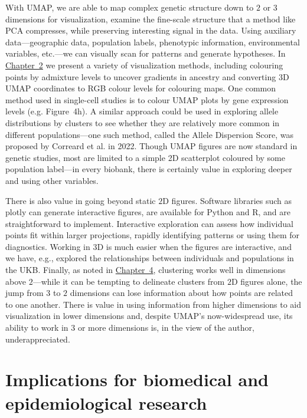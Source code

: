 With UMAP, we are able to map complex genetic structure down to $2$ or $3$ dimensions for visualization, examine the fine-scale structure that a method like PCA compresses, while preserving interesting signal in the data. Using auxiliary data---geographic data, population labels, phenotypic information, environmental variables, etc.---we can visually scan for patterns and generate hypotheses. In \hyperref[chap:chapter2]{Chapter~2} we present a variety of visualization methods, including colouring points by admixture levels to uncover gradients in ancestry and converting 3D UMAP coordinates to RGB colour levels for colouring maps. One common method used in single-cell studies is to colour UMAP plots by gene expression levels (e.g. \citep{jessa_stalled_2019} Figure~4h). A similar approach could be used in exploring allele distributions by clusters to see whether they are relatively more common in different populations---one such method, called the Allele Dispersion Score, was proposed by Correard et al. in 2022\citep{correard_allele_2022}. Though UMAP figures are now standard in genetic studies, most are limited to a simple 2D scatterplot coloured by some population label---in every biobank, there is certainly value in exploring deeper and using other variables.

There is also value in going beyond static $2$D figures. Software libraries such as plotly\citep{plotly} can generate interactive figures, are available for Python and R, and are straightforward to implement. Interactive exploration can assess how individual points fit within larger projections, rapidly identifying patterns or using them for diagnostics. Working in $3$D is much easier when the figures are interactive, and we have, e.g., explored the relationships between individuals and populations in the UKB. Finally, as noted in \hyperref[chap:chapter4]{Chapter~4}, clustering works well in dimensions above $2$---while it can be tempting to delineate clusters from $2$D figures alone, the jump from $3$ to $2$ dimensions can lose information about how points are related to one another. There is value in using information from higher dimensions to aid visualization in lower dimensions and, despite UMAP's now-widespread use, its ability to work in $3$ or more dimensions is, in the view of the author, underappreciated.

\section{Implications for biomedical and epidemiological research}

